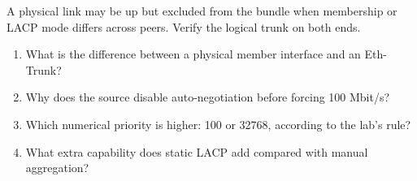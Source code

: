 \begin{pitfall}
A physical link may be up but excluded from the bundle when membership or LACP mode differs across peers. Verify the logical trunk on both ends.
\end{pitfall}

\begin{quickcheck}
\begin{enumerate}
\item What is the difference between a physical member interface and an Eth-Trunk?
\item Why does the source disable auto-negotiation before forcing 100 Mbit/s?
\item Which numerical priority is higher: 100 or 32768, according to the lab's rule?
\item What extra capability does static LACP add compared with manual aggregation?
\end{enumerate}
\end{quickcheck}
